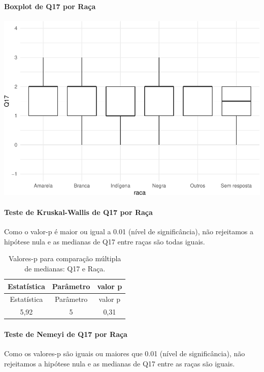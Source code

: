 \documentclass[]{article}
\let\oldparagraph\paragraph
\renewcommand{\paragraph}[1]{\oldparagraph{#1}\mbox{}}
\begin{document}
\hypertarget{boxplot-de-q17-por-rauxe7a}{%
\paragraph{Boxplot de Q17 por Raça}\label{boxplot-de-q17-por-rauxe7a}}

\begin{center}\includegraphics[width=0.75\linewidth]{relatorio_covid19_files/figure-latex/unnamed-chunk-225-1} \end{center}

\hypertarget{teste-de-kruskal-wallis-de-q17-por-rauxe7a}{%
\paragraph{Teste de Kruskal-Wallis de Q17 por Raça}\label{teste-de-kruskal-wallis-de-q17-por-rauxe7a}}

Como o valor-p é maior ou igual a 0.01 (nível de significância), não rejeitamos a hipótese nula e as medianas de Q17 entre raças são todas iguais.

\begin{longtable}[]{@{}ccc@{}}
\caption{\label{tab:unnamed-chunk-227}Valores-p para comparação múltipla de medianas: Q17 e Raça.}\tabularnewline
\toprule
Estatística & Parâmetro & valor p\tabularnewline
\midrule
\endfirsthead
\toprule
Estatística & Parâmetro & valor p\tabularnewline
\midrule
\endhead
5,92 & 5 & 0,31\tabularnewline
\bottomrule
\end{longtable}

\hypertarget{teste-de-nemeyi-de-q17-por-rauxe7a}{%
\paragraph{Teste de Nemeyi de Q17 por Raça}\label{teste-de-nemeyi-de-q17-por-rauxe7a}}

Como os valores-p são iguais ou maiores que 0.01 (nível de significância), não rejeitamos a hipótese nula e as medianas de Q17 entre as raças são iguais.
\end{document}

